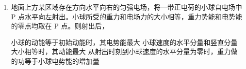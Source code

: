 \documentclass[\gkver]{gaokaozhenti}
\begin{document}
\begin{enumerate}
{C．MN 在运动过程中为非纯电阻电路，MN 上的电流瞬时值为

$i=\frac{u-Blv}{R}$

当 $u=Blv$ 时，MN 上电流瞬时为零，安培力为零此时，MN 速度最大，故 C 错误；

D．在 MN 加速度阶段，由于 MN 反电动势存在，故 MN 上电流小于电阻 R 上的电流，电阻 R 消耗电能大于 MN 上消耗的电能（即 $E_{R}>E_{MN}$），故加速过程中，$Q_{R}>Q_{MN}$；当 MN 减速为零的过程中，电容器的电流和导体棒的电流都流经电阻 R 形成各自的回路，因此可知此时也是电阻 R 的电流大，综上分析可知全过程中电阻 R 上的热量大于导体棒上的热量，故 D 正确。

故选 AD。
}

\item
地面上方某区域存在方向水平向右的匀强电场，将一带正电荷的小球自电场中 P 点水平向左射出。小球所受的重力和电场力的大小相等，重力势能和电势能的零点均取在 P 点。则射出后，

{小球的动能等于初始动能时，其电势能最大}
{小球速度的水平分量和竖直分量大小相等时，其动能最大}
{从射出时刻到小球速度的水平分量为零时，重力做的功等于小球电势能的增加量}



\end{enumerate}
\end{document}
